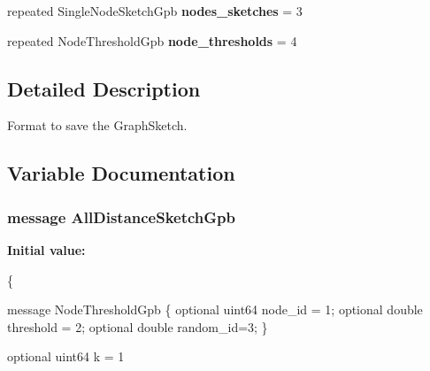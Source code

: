 \begin{DoxyCompactItemize}
\item 
\hypertarget{all__distance__sketch_8proto_a765881cd2a0b68feb5c22546efca3c0d}{}repeated Single\+Node\+Sketch\+Gpb {\bfseries nodes\+\_\+sketches} = 3\label{all__distance__sketch_8proto_a765881cd2a0b68feb5c22546efca3c0d}

\item 
\hypertarget{all__distance__sketch_8proto_aed58d88cd21da325983b8812c64a1556}{}repeated Node\+Threshold\+Gpb {\bfseries node\+\_\+thresholds} = 4\label{all__distance__sketch_8proto_aed58d88cd21da325983b8812c64a1556}

\end{DoxyCompactItemize}


\subsection{Detailed Description}
Format to save the Graph\+Sketch. 



\subsection{Variable Documentation}
\hypertarget{all__distance__sketch_8proto_a1c725f8168567dbd3aa867b4bebba2a0}{}
\subsubsection[{All\+Distance\+Sketch\+Gpb}]{\setlength{\rightskip}{0pt plus 5cm}message All\+Distance\+Sketch\+Gpb}\label{all__distance__sketch_8proto_a1c725f8168567dbd3aa867b4bebba2a0}
{\bfseries Initial value\+:}
\begin{DoxyCode}
\{
  
  message NodeThresholdGpb \{
      optional uint64 node\_id = 1;
      optional \textcolor{keywordtype}{double} threshold = 2;
      optional \textcolor{keywordtype}{double} random\_id=3;
  \}


  optional uint64 k = 1
\end{DoxyCode}
\hypertarget{all__distance__sketch_8proto_a439dc8f2c6166ba58d497513ebc92723}{}
